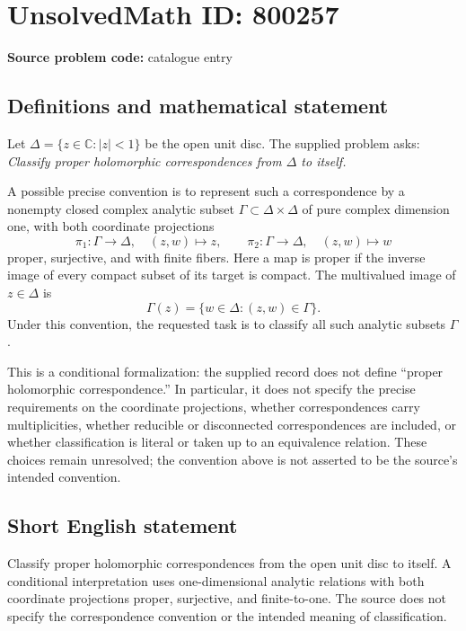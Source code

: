 \documentclass[11pt]{article}
\newcommand{\C}{\mathbb{C}}
\begin{document}
\section*{UnsolvedMath ID: 800257}
\textbf{Source problem code:} catalogue entry
\subsection{Definitions and mathematical statement}
Let \(\Delta=\{z\in\C:|z|<1\}\) be the open unit disc. The supplied problem asks: \emph{Classify proper holomorphic correspondences from \(\Delta\) to itself.}

A possible precise convention is to represent such a correspondence by a nonempty closed complex analytic subset \(\Gamma\subset\Delta\times\Delta\) of pure complex dimension one, with both coordinate projections
\[
\pi_1:\Gamma\to\Delta,\quad (z,w)\mapsto z,
\qquad
\pi_2:\Gamma\to\Delta,\quad (z,w)\mapsto w
\]
proper, surjective, and with finite fibers. Here a map is proper if the inverse image of every compact subset of its target is compact. The multivalued image of \(z\in\Delta\) is
\[
\Gamma(z)=\{w\in\Delta:(z,w)\in\Gamma\}.
\]
Under this convention, the requested task is to classify all such analytic subsets \(\Gamma\).

This is a conditional formalization: the supplied record does not define ``proper holomorphic correspondence.'' In particular, it does not specify the precise requirements on the coordinate projections, whether correspondences carry multiplicities, whether reducible or disconnected correspondences are included, or whether classification is literal or taken up to an equivalence relation. These choices remain unresolved; the convention above is not asserted to be the source's intended convention.
\subsection{Short English statement}
Classify proper holomorphic correspondences from the open unit disc to itself. A conditional interpretation uses one-dimensional analytic relations with both coordinate projections proper, surjective, and finite-to-one. The source does not specify the correspondence convention or the intended meaning of classification.
\end{document}
